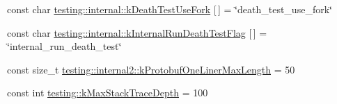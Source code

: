 \begin{DoxyCompactItemize}
\item 
const char \hyperlink{namespacetesting_1_1internal_aefe557a4dfcfd1cb9c7046a26b3c28bb}{testing\-::internal\-::k\-Death\-Test\-Use\-Fork} \mbox{[}$\,$\mbox{]} = \char`\"{}death\-\_\-test\-\_\-use\-\_\-fork\char`\"{}
\item 
const char \hyperlink{namespacetesting_1_1internal_abdcf0e0c1b0ec4fbb1e004c3805997d0}{testing\-::internal\-::k\-Internal\-Run\-Death\-Test\-Flag} \mbox{[}$\,$\mbox{]} = \char`\"{}internal\-\_\-run\-\_\-death\-\_\-test\char`\"{}
\item 
const size\-\_\-t \hyperlink{namespacetesting_1_1internal2_a140c8efd51e63a3def98445bff107518}{testing\-::internal2\-::k\-Protobuf\-One\-Liner\-Max\-Length} = 50
\item 
const int \hyperlink{namespacetesting_ae605f2ccac04616bb7812ca72e517082}{testing\-::k\-Max\-Stack\-Trace\-Depth} = 100
\end{DoxyCompactItemize}


